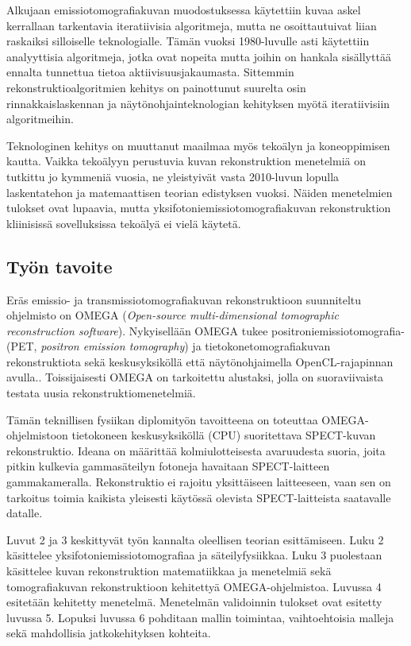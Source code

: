 Alkujaan emissiotomografiakuvan muodostuksessa käytettiin kuvaa askel kerrallaan tarkentavia iteratiivisia algoritmeja, mutta ne osoittautuivat liian raskaiksi silloiselle teknologialle. Tämän vuoksi 1980-luvulle asti käytettiin analyyttisia algoritmeja, jotka ovat nopeita mutta joihin on hankala sisällyttää ennalta tunnettua tietoa aktiivisuusjakaumasta. Sittemmin rekonstruktioalgoritmien kehitys on painottunut suurelta osin rinnakkaislaskennan ja näytönohjainteknologian kehityksen myötä iteratiivisiin algoritmeihin.\cite{bruyant_analytic_2002} 

Teknologinen kehitys on muuttanut maailmaa myös tekoälyn ja koneoppimisen kautta. Vaikka tekoälyyn perustuvia kuvan rekonstruktion menetelmiä on tutkittu jo kymmeniä vuosia, ne yleistyivät vasta 2010-luvun lopulla laskentatehon ja matemaattisen teorian edistyksen vuoksi. Näiden menetelmien tulokset ovat lupaavia, mutta yksifotoniemissiotomografiakuvan rekonstruktion kliinisissä sovelluksissa tekoälyä ei vielä käytetä.\cite{shao_artificial_2021}

\subsection{Työn tavoite}
Eräs emissio- ja transmissiotomografiakuvan rekonstruktioon suunniteltu ohjelmisto on OMEGA (\textit{Open-source multi-dimensional tomographic reconstruction software}). Nykyisellään OMEGA tukee positroniemissiotomografia- (PET, \textit{positron emission tomography}) ja tietokonetomografiakuvan rekonstruktiota sekä keskusyksiköllä että näytönohjaimella OpenCL-rajapinnan avulla.\cite{wettenhovi_omegaopen-source_2021}. Toissijaisesti OMEGA on tarkoitettu alustaksi, jolla on suoraviivaista testata uusia rekonstruktiomenetelmiä. 

Tämän teknillisen fysiikan diplomityön tavoitteena on toteuttaa OMEGA-ohjelmistoon tietokoneen keskusyksiköllä (CPU) suoritettava SPECT-kuvan rekonstruktio. Ideana on määrittää kolmiulotteisesta avaruudesta suoria, joita pitkin kulkevia gammasäteilyn fotoneja havaitaan SPECT-laitteen gammakameralla. Rekonstruktio ei rajoitu yksittäiseen laitteeseen, vaan sen on tarkoitus toimia kaikista yleisesti käytössä olevista SPECT-laitteista saatavalle datalle.

Luvut 2 ja 3 keskittyvät työn kannalta oleellisen teorian esittämiseen. Luku 2 käsittelee yksifotoniemissiotomografiaa ja säteilyfysiikkaa. Luku 3 puolestaan käsittelee kuvan rekonstruktion matematiikkaa ja menetelmiä sekä tomografiakuvan rekonstruktioon kehitettyä OMEGA-ohjelmistoa. Luvussa 4 esitetään kehitetty menetelmä. Menetelmän validoinnin tulokset ovat esitetty luvussa 5. Lopuksi luvussa 6 pohditaan mallin toimintaa, vaihtoehtoisia malleja sekä mahdollisia jatkokehityksen kohteita.